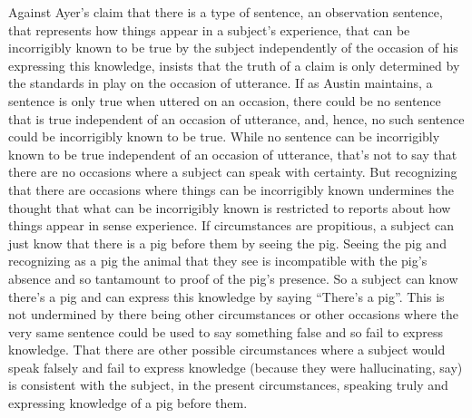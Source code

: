 \documentclass[12pt]{article}
\begin{document}
Against Ayer's \citeyearpar{Ayer:1958kx} claim that there is a type of sentence, an observation sentence, that represents how things appear in a subject's experience, that can be incorrigibly known to be true by the subject independently of the occasion of his expressing this knowledge, \citet{Austin:1962lr} insists that the truth of a claim is only determined by the standards in play on the occasion of utterance. If as Austin maintains, a sentence is only true when uttered on an occasion, there could be no sentence that is true independent of an occasion of utterance, and, hence, no such sentence could be incorrigibly known to be true. While no sentence can be incorrigibly known to be true independent of an occasion of utterance, that's not to say that there are no occasions where a subject can speak with certainty. But recognizing that there are occasions where things can be incorrigibly known undermines the thought that what can be incorrigibly known is restricted to reports about how things appear in sense experience. 
If circumstances are propitious, a subject can just know that there is a pig before them by seeing the pig. Seeing the pig and recognizing as a pig the animal that they see is incompatible with the pig's absence and so tantamount to proof of the pig's presence. So a subject can know there's a pig and can express this knowledge by saying ``There's a pig''. This is not undermined by there being other circumstances or other occasions where the very same sentence could be used to say something false and so fail to express knowledge. That there are other possible circumstances where a subject would speak falsely and fail to express knowledge (because they were hallucinating, say) is consistent with the subject, in the present circumstances, speaking truly and expressing knowledge of a pig before them. 
\end{document}
